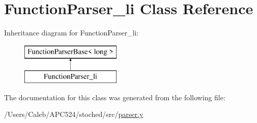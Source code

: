 \hypertarget{class_function_parser__li}{}\section{Function\+Parser\+\_\+li Class Reference}
\label{class_function_parser__li}
Inheritance diagram for Function\+Parser\+\_\+li\+:\begin{figure}[H]
\begin{center}
\leavevmode
\includegraphics[height=2.000000cm]{class_function_parser__li}
\end{center}
\end{figure}


The documentation for this class was generated from the following file\+:\begin{DoxyCompactItemize}
\item 
/\+Users/\+Caleb/\+A\+P\+C524/stoched/src/\hyperlink{parser_8y}{parser.\+y}\end{DoxyCompactItemize}
